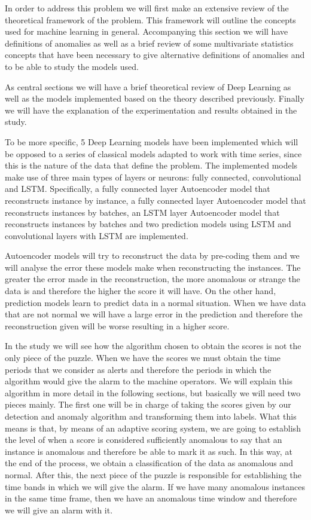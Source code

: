 In order to address this problem we will first make an extensive review of the theoretical framework of the problem. This framework will outline the concepts used for machine learning in general. Accompanying this section we will have definitions of anomalies as well as a brief review of some multivariate statistics concepts that have been necessary to give alternative definitions of anomalies and to be able to study the models used.

As central sections we will have a brief theoretical review of Deep Learning as well as the models implemented based on the theory described previously. Finally we will have the explanation of the experimentation and results obtained in the study.

To be more specific, 5 Deep Learning models have been implemented which will be opposed to a series of classical models adapted to work with time series, since this is the nature of the data that define the problem. The implemented models make use of three main types of layers or neurons: fully connected, convolutional and LSTM. Specifically, a fully connected layer Autoencoder model that reconstructs instance by instance, a fully connected layer Autoencoder model that reconstructs instances by batches, an LSTM layer Autoencoder model that reconstructs instances by batches and two prediction models using LSTM and convolutional layers with LSTM are implemented.

Autoencoder models will try to reconstruct the data by pre-coding them and we will analyse the error these models make when reconstructing the instances. The greater the error made in the reconstruction, the more anomalous or strange the data is and therefore the higher the score it will have. On the other hand, prediction models learn to predict data in a normal situation. When we have data that are not normal we will have a large error in the prediction and therefore the reconstruction given will be worse resulting in a higher score.

In the study we will see how the algorithm chosen to obtain the scores is not the only piece of the puzzle. When we have the scores we must obtain the time periods that we consider as alerts and therefore the periods in which the algorithm would give the alarm to the machine operators. We will explain this algorithm in more detail in the following sections, but basically we will need two pieces mainly. The first one will be in charge of taking the scores given by our detection and anomaly algorithm and transforming them into labels. What this means is that, by means of an adaptive scoring system, we are going to establish the level of when a score is considered sufficiently anomalous to say that an instance is anomalous and therefore be able to mark it as such. In this way, at the end of the process, we obtain a classification of the data as anomalous and normal. After this, the next piece of the puzzle is responsible for establishing the time bands in which we will give the alarm. If we have many anomalous instances in the same time frame, then we have an anomalous time window and therefore we will give an alarm with it.

